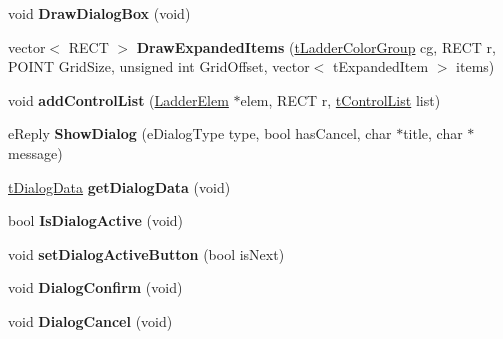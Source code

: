 \begin{DoxyCompactItemize}
\item 
\hypertarget{class_ladder_g_u_i_a6a50a402954c5a206744291b53b48cd5}{void {\bfseries Draw\-Dialog\-Box} (void)}\label{class_ladder_g_u_i_a6a50a402954c5a206744291b53b48cd5}

\item 
\hypertarget{class_ladder_g_u_i_a067c37178b174a5923371e9ac7758756}{vector$<$ R\-E\-C\-T $>$ {\bfseries Draw\-Expanded\-Items} (\hyperlink{structt_ladder_color_group}{t\-Ladder\-Color\-Group} cg, R\-E\-C\-T r, P\-O\-I\-N\-T Grid\-Size, unsigned int Grid\-Offset, vector$<$ t\-Expanded\-Item $>$ items)}\label{class_ladder_g_u_i_a067c37178b174a5923371e9ac7758756}

\item 
\hypertarget{class_ladder_g_u_i_a6b74a8479f0f38925f1185f05d34e78a}{void {\bfseries add\-Control\-List} (\hyperlink{class_ladder_elem}{Ladder\-Elem} $\ast$elem, R\-E\-C\-T r, \hyperlink{structt_control_list}{t\-Control\-List} list)}\label{class_ladder_g_u_i_a6b74a8479f0f38925f1185f05d34e78a}

\item 
\hypertarget{class_ladder_g_u_i_ae2b0716310eadc106c8730d7706b287c}{e\-Reply {\bfseries Show\-Dialog} (e\-Dialog\-Type type, bool has\-Cancel, char $\ast$title, char $\ast$message)}\label{class_ladder_g_u_i_ae2b0716310eadc106c8730d7706b287c}

\item 
\hypertarget{class_ladder_g_u_i_a762cb36ef9f9102f89d3e0b173bddb75}{\hyperlink{structt_dialog_data}{t\-Dialog\-Data} {\bfseries get\-Dialog\-Data} (void)}\label{class_ladder_g_u_i_a762cb36ef9f9102f89d3e0b173bddb75}

\item 
\hypertarget{class_ladder_g_u_i_a4e369f5fcdcee6201cb3dfc3f698baad}{bool {\bfseries Is\-Dialog\-Active} (void)}\label{class_ladder_g_u_i_a4e369f5fcdcee6201cb3dfc3f698baad}

\item 
\hypertarget{class_ladder_g_u_i_a0a96784ef888dada1ab256521b2b7cee}{void {\bfseries set\-Dialog\-Active\-Button} (bool is\-Next)}\label{class_ladder_g_u_i_a0a96784ef888dada1ab256521b2b7cee}

\item 
\hypertarget{class_ladder_g_u_i_a34f680c13d12768f5a0a2865d546876f}{void {\bfseries Dialog\-Confirm} (void)}\label{class_ladder_g_u_i_a34f680c13d12768f5a0a2865d546876f}

\item 
\hypertarget{class_ladder_g_u_i_a3257f215cfbd8e01c2807a722d480ff3}{void {\bfseries Dialog\-Cancel} (void)}\label{class_ladder_g_u_i_a3257f215cfbd8e01c2807a722d480ff3}


\end{DoxyCompactItemize}
